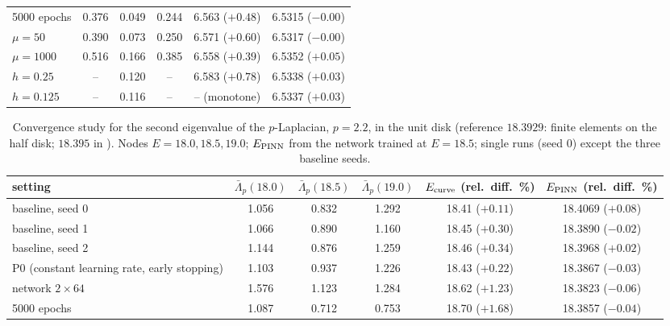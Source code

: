 \documentclass[10pt]{amsart}
\newenvironment{revblock}{\color{blue}}{}
\theoremstyle{definition}
\theoremstyle{remark}
\theoremstyle{plain}
\begin{document}
\begin{revblock}
\begin{table}[H]
\begin{tabular}{lccccc}
5000 epochs & 0.376 & 0.049 & 0.244 & 6.563 ($+0.48$) & 6.5315 ($-0.00$)\\
$\mu=50$ & 0.390 & 0.073 & 0.250 & 6.571 ($+0.60$) & 6.5317 ($-0.00$)\\
$\mu=1000$ & 0.516 & 0.166 & 0.385 & 6.558 ($+0.39$) & 6.5352 ($+0.05$)\\
$h=0.25$ & -- & 0.120 & -- & 6.583 ($+0.78$) & 6.5338 ($+0.03$)\\
$h=0.125$ & -- & 0.116 & -- & -- (monotone) & 6.5337 ($+0.03$)\\
\bottomrule
\end{tabular}
\end{table}

\begin{table}[H]
\centering\small
\color{blue}
\caption{Convergence study for the second eigenvalue of the $p$-Laplacian, $p=2.2$, in the unit disk (reference $18.3929$: finite elements on the half disk; $18.395$ in \cite{HJ11}). Nodes $E=18.0,18.5,19.0$; $E_{\rm PINN}$ from the network trained at $E=18.5$; single runs (seed 0) except the three baseline seeds.}
\label{tab.plap.conv2}
\begin{tabular}{lccccc}
\toprule
setting & $\bar\Lambda_p(18.0)$ & $\bar\Lambda_p(18.5)$ & $\bar\Lambda_p(19.0)$ & $E_{\rm curve}$ (rel.\ diff.\ \%) & $E_{\rm PINN}$ (rel.\ diff.\ \%)\\
\midrule
baseline, seed 0 & 1.056 & 0.832 & 1.292 & 18.41 ($+0.11$) & 18.4069 ($+0.08$)\\
baseline, seed 1 & 1.066 & 0.890 & 1.160 & 18.45 ($+0.30$) & 18.3890 ($-0.02$)\\
baseline, seed 2 & 1.144 & 0.876 & 1.259 & 18.46 ($+0.34$) & 18.3968 ($+0.02$)\\
P0 (constant learning rate, early stopping) & 1.103 & 0.937 & 1.226 & 18.43 ($+0.22$) & 18.3867 ($-0.03$)\\
network $2\times64$ & 1.576 & 1.123 & 1.284 & 18.62 ($+1.23$) & 18.3823 ($-0.06$)\\
5000 epochs & 1.087 & 0.712 & 0.753 & 18.70 ($+1.68$) & 18.3857 ($-0.04$)\\
\bottomrule
\end{tabular}
\end{table}
\end{revblock}
\end{document}
